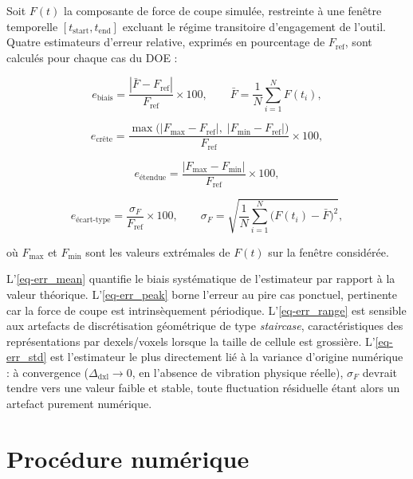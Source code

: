 \documentclass[
    11pt,
    a4paper
]{article}
\newcommand{\Fref}{F_{\mathrm{ref}}}
\newcommand{\dxlsize}{\Delta_{\mathrm{dxl}}}
\begin{document}
Soit \(F(t)\) la composante de force de coupe simulée,
restreinte à une fenêtre temporelle \([t_{\mathrm{start}}, t_{\mathrm{end}}]\) excluant le
régime transitoire d'engagement de l'outil. Quatre estimateurs d'erreur relative,
exprimés en pourcentage de \(\Fref\), sont calculés pour chaque cas du DOE :

\begin{equation}
    e_{\mathrm{biais}} = \frac{\left| \bar{F} - \Fref \right|}{\Fref} \times 100,
    \qquad
    \bar{F} = \frac{1}{N}\sum_{i=1}^{N} F(t_i),
    \label{eq-err_mean}
\end{equation}

\begin{equation}
    e_{\text{crête}} = \frac{\max\big(|F_{\max}-\Fref|,\; |F_{\min}-\Fref|\big)}{\Fref} \times 100,
    \label{eq-err_peak}
\end{equation}

\begin{equation}
    e_{\text{étendue}} = \frac{|F_{\max} - F_{\min}|}{\Fref} \times 100,
    \label{eq-err_range}
\end{equation}

\begin{equation}
    e_{\text{écart-type}} = \frac{\sigma_F}{\Fref} \times 100,
    \qquad
    \sigma_F = \sqrt{\frac{1}{N}\sum_{i=1}^{N} \big(F(t_i)-\bar{F}\big)^2},
    \label{eq-err_std}
\end{equation}

où \(F_{\max}\) et \(F_{\min}\) sont les valeurs extrémales de \(F(t)\) sur la fenêtre
considérée.

L'{}\cref{eq-err_mean} quantifie le biais systématique de l'estimateur par rapport à la
valeur théorique. L'{}\cref{eq-err_peak} borne l'erreur au pire cas ponctuel, pertinente car
la force de coupe est intrinsèquement périodique. L'{}\cref{eq-err_range} est sensible aux
artefacts de discrétisation géométrique de type \emph{staircase}, caractéristiques des
représentations par dexels/voxels lorsque la taille de cellule est grossière.
L'{}\cref{eq-err_std} est l'estimateur le plus directement lié à la variance d'origine
numérique : à convergence (\(\dxlsize \to 0\), en l'absence de vibration physique réelle),
\(\sigma_F\) devrait tendre vers une valeur faible et stable, toute fluctuation résiduelle
étant alors un artefact purement numérique.

\section{Procédure numérique}
\label{sec-procedure}
\end{document}
